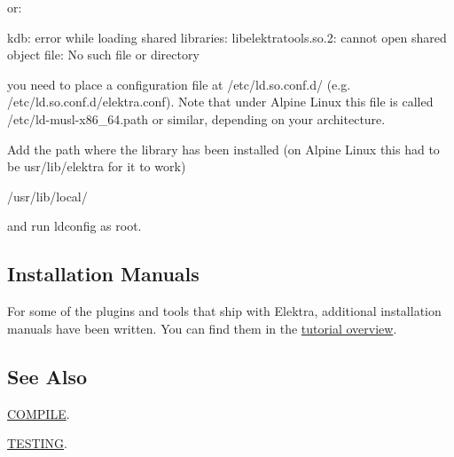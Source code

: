 or\+:


\begin{DoxyCode}
kdb: error while loading shared libraries:
     libelektratools.so.2: cannot open shared object file: No such file or directory
\end{DoxyCode}


you need to place a configuration file at {\ttfamily /etc/ld.so.\+conf.\+d/} (e.\+g. {\ttfamily /etc/ld.so.\+conf.\+d/elektra.conf}). Note that under Alpine Linux this file is called {\ttfamily /etc/ld-\/musl-\/x86\+\_\+64.path} or similar, depending on your architecture.

Add the path where the library has been installed (on Alpine Linux this had to be {\ttfamily usr/lib/elektra} for it to work)


\begin{DoxyCode}
/usr/lib/local/
\end{DoxyCode}


and run {\ttfamily ldconfig} as root.

\subsection*{Installation Manuals}

For some of the plugins and tools that ship with Elektra, additional installation manuals have been written. You can find them in the \hyperlink{md_doc_tutorials_README_doc_tutorials_README_md}{tutorial overview}.

\subsection*{See Also}


\begin{DoxyItemize}
\item \hyperlink{doc_COMPILE_md}{C\+O\+M\+P\+I\+LE}.
\item \hyperlink{doc_TESTING_md}{T\+E\+S\+T\+I\+NG}. 
\end{DoxyItemize}
